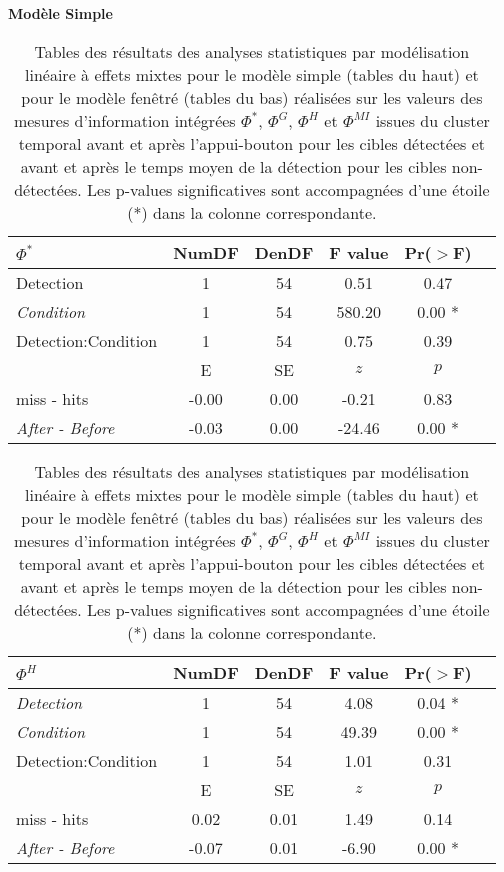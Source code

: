 \begin{table}[!t]
\centering
\scriptsize
\caption[Table des résultats des analyses statistiques pour les mesures de la TII du cluster temporal]{Tables des résultats des analyses statistiques par modélisation linéaire à effets mixtes pour le modèle simple (tables du haut) et pour le modèle fenêtré (tables du bas) réalisées sur les valeurs des mesures d'information intégrées $\Phi^{*}$, $\Phi^{G}$, $\Phi^{H}$ et $\Phi^{MI}$ issues du cluster temporal avant et après l'appui-bouton pour les cibles détectées et avant et après le temps moyen de la détection pour les cibles non-détectées. Les p-values significatives sont accompagnées d'une étoile (*) dans la colonne correspondante.}
\label{tab:table5statsmesuresIITclustertemporal}

\textbf{Modèle Simple}

\begin{multicols}{2}

\begin{tabular}{|l|*{5}{c|}}
\hline
\textbf{$\Phi^{*}$} & \textbf{NumDF} & \textbf{DenDF} & \textbf{F value} & \textbf{Pr($>$F)} \\ 
\hline
Detection & 1 & 54 & 0.51 & 0.47 \\ 
\textit{Condition} & 1 & 54 & 580.20 & 0.00 * \\ 
Detection:Condition & 1 & 54 & 0.75 & 0.39 \\ 
\hline
& E & SE & $z$ & $p$ \\
\hline
miss - hits & -0.00 & 0.00 & -0.21 & 0.83 \\ 
\hline
\textit{After - Before} & -0.03 & 0.00 & -24.46 & 0.00 * \\ 
\hline
\end{tabular}

\vspace{2.55cm}

\begin{tabular}{|l|*{5}{c|}}
\hline
\textbf{$\Phi^{H}$} & \textbf{NumDF} & \textbf{DenDF} & \textbf{F value} & \textbf{Pr($>$F)} \\ 
\hline
\textit{Detection} & 1 & 54 & 4.08 & 0.04 * \\ 
\textit{Condition} & 1 & 54 & 49.39 & 0.00 * \\ 
Detection:Condition & 1 & 54 & 1.01 & 0.31 \\ 
\hline
& E & SE & $z$ & $p$ \\
\hline
miss - hits & 0.02 & 0.01 & 1.49 & 0.14 \\ 
\hline
\textit{After - Before} & -0.07 & 0.01 & -6.90 & 0.00 * \\ 
\hline
\end{tabular}


\end{multicols}
\end{table}
